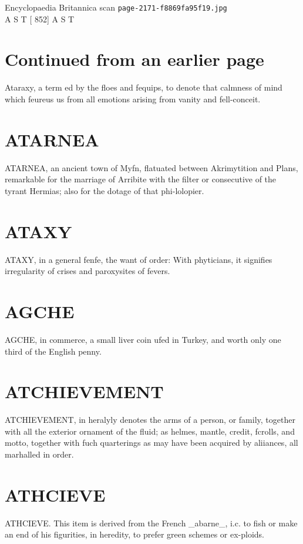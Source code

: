 \documentclass{article}
\begin{document}
\begin{center}
{\Large Encyclopaedia Britannica scan \texttt{page-2171-f8869fa95f19.jpg}}\\[0.5em]
A S T [ 852] A S T
\end{center}
\section*{Continued from an earlier page}
Ataraxy, a term ed by the floes and fequips, to denote that calmness of mind which feureus us from all emotions arising from vanity and fell-conceit.

\section*{ATARNEA}
ATARNEA, an ancient town of Myfn, flatuated between Akrimytition and Plans, remarkable for the marriage of Arribite with the filter or consecutive of the tyrant Hermias; also for the dotage of that phi-lolopier.

\section*{ATAXY}
ATAXY, in a general fenfe, the want of order: With phyticians, it signifies irregularity of crises and paroxysites of fevers.

\section*{AGCHE}
AGCHE, in commerce, a small liver coin ufed in Turkey, and worth only one third of the English penny.

\section*{ATCHIEVEMENT}
ATCHIEVEMENT, in heralyly denotes the arms of a person, or family, together with all the exterior ornament of the fluid; as helmes, mantle, credit, fcrolls, and motto, together with fuch quarterings as may have been acquired by aliiances, all marhalled in order.

\section*{ATHCIEVE}
ATHCIEVE. This item is derived from the French \_abarne\_, i.c. to fish or make an end of his figurities, in heredity, to prefer green schemes or ex-ploids.
\end{document}
